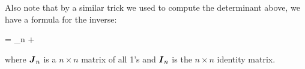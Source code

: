 \documentclass[12pt]{article}
\begin{document}
Also note that by a similar trick we used to compute the determinant above, we have a formula for the inverse:

\beqn
\bSigmanellinv =   _n + \oneover{\sigsq} 
\eeqn

where $\boldsymbol{J}_n$ is a $n \times n$ matrix of all 1's and $\boldsymbol{I}_n$ is the $n \times n$ identity matrix.
\end{document}
